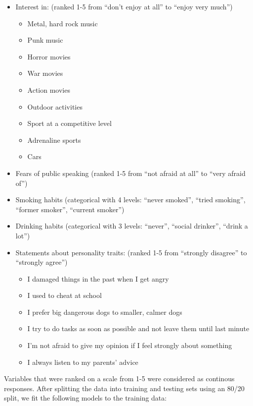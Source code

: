 \documentclass[]{article}
\providecommand{\tightlist}{%
  \setlength{\itemsep}{0pt}\setlength{\parskip}{0pt}}
\begin{document}
\begin{itemize}
\item
  Interest in: (ranked 1-5 from ``don't enjoy at all'' to ``enjoy very
  much'')

  \begin{itemize}
  \tightlist
  \item
    Metal, hard rock music
  \item
    Punk music
  \item
    Horror movies
  \item
    War movies
  \item
    Action movies
  \item
    Outdoor activities
  \item
    Sport at a competitive level
  \item
    Adrenaline sports
  \item
    Cars
  \end{itemize}
\item
  Fears of public speaking (ranked 1-5 from ``not afraid at all'' to
  ``very afraid of'')
\item
  Smoking habits (categorical with 4 levels: ``never smoked'', ``tried
  smoking'', ``former smoker'', ``current smoker'')
\item
  Drinking habits (categorical with 3 levels: ``never'', ``social
  drinker'', ``drink a lot'')
\item
  Statements about personality traits: (ranked 1-5 from ``strongly
  disagree'' to ``strongly agree'')

  \begin{itemize}
  \tightlist
  \item
    I damaged things in the past when I get angry
  \item
    I used to cheat at school
  \item
    I prefer big dangerous dogs to smaller, calmer dogs
  \item
    I try to do tasks as soon as possible and not leave them until last
    minute
  \item
    I'm not afraid to give my opinion if I feel strongly about something
  \item
    I always listen to my parents' advice
  \end{itemize}
\end{itemize}

Variables that were ranked on a scale from 1-5 were considered as
continous responses. After splitting the data into training and testing
sets using an 80/20 split, we fit the following models to the training
data:
\end{document}
